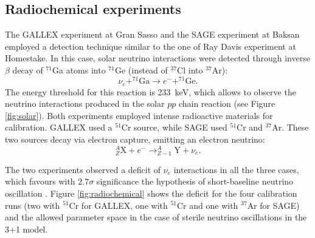 \subsection{Radiochemical experiments}
    The GALLEX experiment at Gran Sasso and the SAGE experiment at Baksan employed a detection technique similar to the one of Ray Davis experiment at Homestake. In this case, solar neutrino interactions were detected through inverse $\beta$ decay of $^{71}$Ga atoms into $^{71}$Ge (instead of $^{37}$Cl into $^{37}$Ar):
\begin{equation}
    \nu_e + ^{71}\mathrm{Ga} \rightarrow e^- + ^{71}\mathrm{Ge}.
\end{equation}
The energy threshold for this reaction is 233~keV, which allows to observe the neutrino interactions produced in the solar $pp$ chain reaction (see Figure \ref{fig:solar}). Both experiments employed intense radioactive materials for calibration. GALLEX used a $^{51}$Cr source, while SAGE used $^{51}$Cr and $^{37}$Ar. These two sources decay via electron capture, emitting an electron neutrino:
\begin{equation} 
    ^{A}_{Z}\mathrm{X} + e^{-} \rightarrow ^{A}_{Z-1}\mathrm{Y} + \nu_{e}.
\end{equation}

The two experiments observed a deficit of $\nu_{e}$ interactions in all the three cases, which favours with $2.7\sigma$ significance the hypothesis of short-baseline neutrino oscillation \cite{Giunti:2010zu}.
Figure \ref{fig:radiochemical} shows the deficit for the four calibration runs (two with $^{51}$Cr for GALLEX, one with $^{51}$Cr and one with $^{37}$Ar for SAGE) and the allowed parameter space in the case of sterile neutrino oscillations in the 3+1 model.

